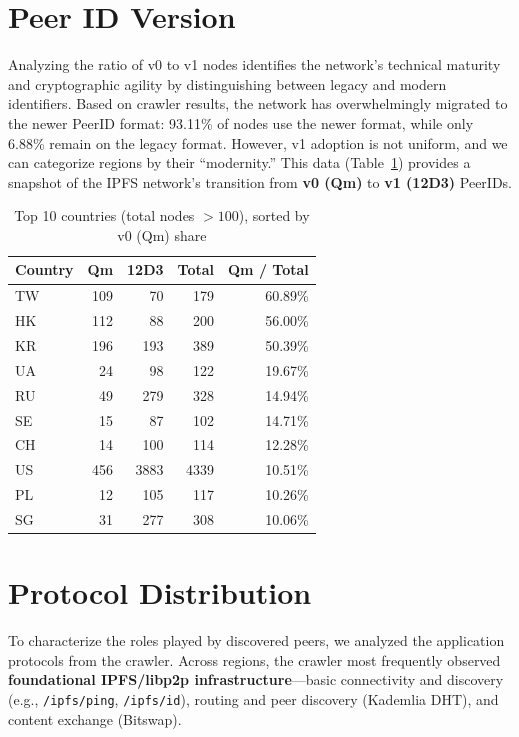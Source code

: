 \documentclass[10pt,a4paper,twocolumn]{article}
\begin{document}
\section{Peer ID Version}
Analyzing the ratio of v0 to v1 nodes identifies the network's technical maturity and cryptographic agility by distinguishing between legacy and modern identifiers. Based on crawler results, the network has overwhelmingly migrated to the newer PeerID format: 93.11\% of nodes use the newer format, while only 6.88\% remain on the legacy format. However, v1 adoption is not uniform, and we can categorize regions by their ``modernity.'' This data (Table~\ref{tab:peerid_country}) provides a snapshot of the IPFS network's transition from \textbf{v0 (Qm)} to \textbf{v1 (12D3)} PeerIDs.
\begin{table}[ht]
    \centering
    \caption{Top 10 countries (total nodes $> 100$), sorted by v0 (Qm) share}
    \label{tab:peerid_country}
    \begin{tabular}{lrrrr}
        \hline
        Country & Qm & 12D3 & Total & Qm / Total \\
        \hline
        TW & 109 & 70  & 179  & 60.89\% \\
        HK & 112 & 88  & 200  & 56.00\% \\
        KR & 196 & 193 & 389  & 50.39\% \\
        UA & 24  & 98  & 122  & 19.67\% \\
        RU & 49  & 279 & 328  & 14.94\% \\
        SE & 15  & 87  & 102  & 14.71\% \\
        CH & 14  & 100 & 114  & 12.28\% \\
        US & 456 & 3883 & 4339 & 10.51\% \\
        PL & 12  & 105 & 117  & 10.26\% \\
        SG & 31  & 277 & 308  & 10.06\% \\
        \hline
    \end{tabular}
\end{table}


\section{Protocol Distribution}
To characterize the roles played by discovered peers, we analyzed the application protocols from the crawler. Across regions, the crawler most frequently observed \textbf{foundational IPFS/libp2p infrastructure}---basic connectivity and discovery (e.g., \texttt{/ipfs/ping}, \texttt{/ipfs/id}), routing and peer discovery (Kademlia DHT), and content exchange (Bitswap). 
\end{document}
